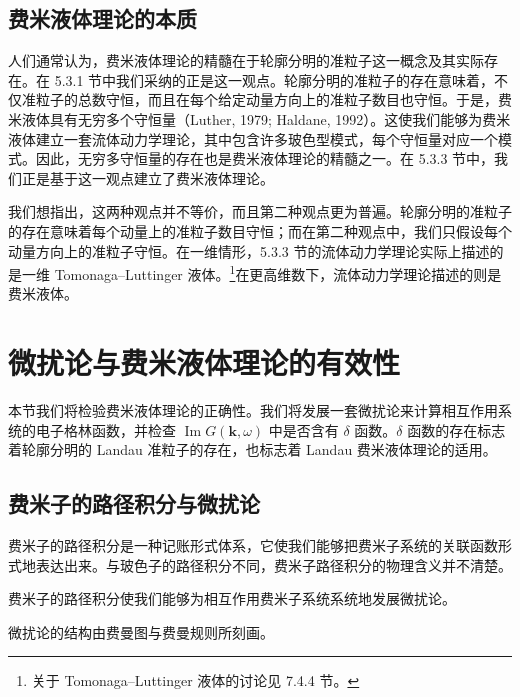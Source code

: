 \subsection{费米液体理论的本质}

人们通常认为，费米液体理论的精髓在于轮廓分明的准粒子这一概念及其实际存在。在 5.3.1 节中我们采纳的正是这一观点。轮廓分明的准粒子的存在意味着，不仅准粒子的总数守恒，而且在每个给定动量方向上的准粒子数目也守恒。于是，费米液体具有无穷多个守恒量（Luther, 1979; Haldane, 1992）。这使我们能够为费米液体建立一套流体动力学理论，其中包含许多玻色型模式，每个守恒量对应一个模式。因此，无穷多守恒量的存在也是费米液体理论的精髓之一。在 5.3.3 节中，我们正是基于这一观点建立了费米液体理论。

我们想指出，这两种观点并不等价，而且第二种观点更为普遍。轮廓分明的准粒子的存在意味着每个动量上的准粒子数目守恒；而在第二种观点中，我们只假设每个动量方向上的准粒子守恒。在一维情形，5.3.3 节的流体动力学理论实际上描述的是一维 Tomonaga--Luttinger 液体。\footnote{关于 Tomonaga--Luttinger 液体的讨论见 7.4.4 节。}在更高维数下，流体动力学理论描述的则是费米液体。

\section{微扰论与费米液体理论的有效性}

本节我们将检验费米液体理论的正确性。我们将发展一套微扰论来计算相互作用系统的电子格林函数，并检查 $\operatorname{Im}G(\pmb{k},\omega)$ 中是否含有 $\delta$ 函数。$\delta$ 函数的存在标志着轮廓分明的 Landau 准粒子的存在，也标志着 Landau 费米液体理论的适用。

\subsection{费米子的路径积分与微扰论}

\begin{keypoints}
\item 费米子的路径积分是一种记账形式体系，它使我们能够把费米子系统的关联函数形式地表达出来。与玻色子的路径积分不同，费米子路径积分的物理含义并不清楚。
\item 费米子的路径积分使我们能够为相互作用费米子系统系统地发展微扰论。
\item 微扰论的结构由费曼图与费曼规则所刻画。
\end{keypoints}

